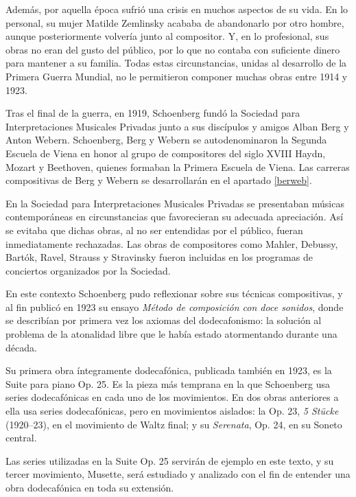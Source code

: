 		Además, por aquella época sufrió una crisis en muchos aspectos de su vida. En lo personal, su mujer Matilde Zemlinsky acababa de abandonarlo por otro hombre, aunque posteriormente volvería junto al compositor. Y, en lo profesional, sus obras no eran del gusto del público, por lo que no contaba con suficiente dinero para mantener a su familia. Todas estas circunstancias, unidas al desarrollo de la Primera Guerra Mundial, no le permitieron componer muchas obras entre 1914 y 1923.
		
		Tras el final de la guerra, en 1919, Schoenberg fundó la Sociedad para Interpretaciones Musicales Privadas junto a sus discípulos y amigos Alban Berg y Anton Webern. Schoenberg, Berg y Webern se autodenominaron la Segunda Escuela de Viena en honor al grupo de compositores del siglo XVIII Haydn, Mozart y Beethoven, quienes formaban la Primera Escuela de Viena. Las carreras compositivas de Berg y Webern se desarrollarán en el apartado \ref{berweb}.
		
		En la Sociedad para Interpretaciones Musicales Privadas se presentaban músicas contemporáneas en circunstancias que favorecieran su adecuada apreciación. Así se evitaba que dichas obras, al no ser entendidas por el público, fueran inmediatamente rechazadas. Las obras de compositores como Mahler, Debussy, Bartók, Ravel, Strauss y Stravinsky fueron incluidas en los programas de conciertos organizados por la Sociedad.
		
		En este contexto Schoenberg pudo reflexionar sobre sus técnicas compositivas, y al fin publicó en 1923 su ensayo \emph{Método de composición con doce sonidos}, donde se describían por primera vez los axiomas del dodecafonismo: la solución al problema de la atonalidad libre que le había estado atormentando durante una década.
		
		Su primera obra íntegramente dodecafónica, publicada también en 1923, es la Suite para piano Op. 25. Es la pieza más temprana en la que Schoenberg usa series dodecafónicas en cada uno de los movimientos. En dos obras anteriores a ella usa series dodecafónicas, pero en movimientos aislados: la Op. 23, \emph{5 Stücke} (1920--23), en el movimiento de Waltz final; y su \emph{Serenata}, Op. 24, en su Soneto central.
		
		Las series utilizadas en la Suite Op. 25 servirán de ejemplo en este texto, y su tercer movimiento, Musette, será estudiado y analizado con el fin de entender una obra dodecafónica en toda su extensión.
